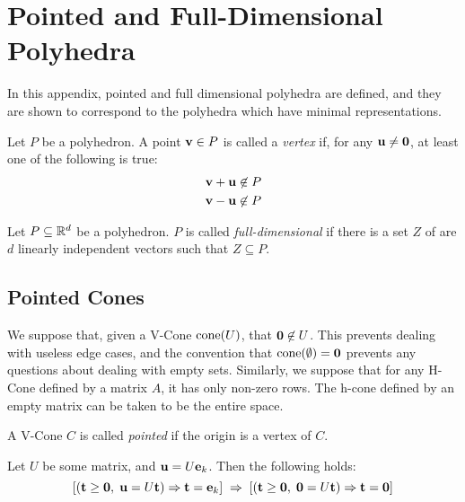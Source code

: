 
\chapter{Pointed and Full-Dimensional Polyhedra}

In this appendix, pointed and full dimensional polyhedra are defined, and they are shown to correspond to the polyhedra which have minimal representations.

\begin{Def}[Vertex]
	Let $P$ be a polyhedron.  A point $\mathbf{v} \in P$ is called a \textit{vertex} if, for any $\mathbf{u} \neq \mathbf{0}$, at least one of the following is true:
	\begin{align*}
		\mathbf{v} + \mathbf{u} \not\in P \\
		\mathbf{v} - \mathbf{u} \not\in P \\
	\end{align*}
\end{Def}

\begin{Def}
	Let $P \subseteq \mathbb{R}^d$ be a polyhedron.  $P$ is called \textit{full-dimensional} if there is a set $Z$ of are $d$ linearly independent vectors such that $Z \subseteq P$.
\end{Def}

\section{Pointed Cones}

We suppose that, given a V-Cone $\operatorname{cone}(U)$, that $\mathbf{0}\not\in U$.  This prevents dealing with useless edge cases, and the convention that $\operatorname{cone}(\emptyset) = \mathbf{0}$ prevents any questions about dealing with empty sets.  Similarly, we suppose that for any H-Cone defined by a matrix $A$, it has only non-zero rows.  The h-cone defined by an empty matrix can be taken to be the entire space.

\begin{Def}
	A V-Cone $C$ is called \textit{pointed} if the origin is a vertex of $C$.
\end{Def}

\begin{Lemma}\label{minimal_independence}
	Let $U$ be some matrix, and $\mathbf{u} = U\mathbf{e}_k$.  Then the following holds:
	\[[(\mathbf{t}\geq\mathbf{0},\; \mathbf{u} = U\mathbf{t}) \Rightarrow \mathbf{t}=\mathbf{e}_k] \;\Rightarrow\;
		[(\mathbf{t}\geq\mathbf{0},\;\mathbf{0}=U\mathbf{t}) \Rightarrow \mathbf{t}=\mathbf{0}]\]
\end{Lemma}

